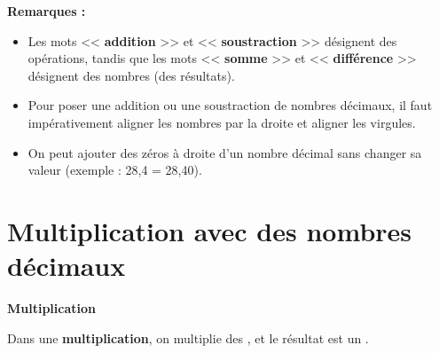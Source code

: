 

\textbf{Remarques :}
\begin{itemize}
	\item Les mots << \textbf{addition} >> et << \textbf{soustraction} >> désignent des opérations, tandis que les mots << \textbf{somme} >> et << \textbf{différence} >> désignent des nombres (des résultats).
	\item Pour poser une addition ou une soustraction de nombres décimaux, il faut impérativement aligner les nombres par la droite et aligner les virgules.
	\item On peut ajouter des zéros à droite d'un nombre décimal sans changer sa valeur (exemple : 28,4 = 28,40).
\end{itemize}

\section{Multiplication avec des nombres décimaux}

\begin{definitionbox}
	\textbf{Multiplication}
	
	Dans une \textbf{multiplication}, on multiplie des \trous{2.5cm}, et le résultat est un \trous{2cm}.
\end{definitionbox}


